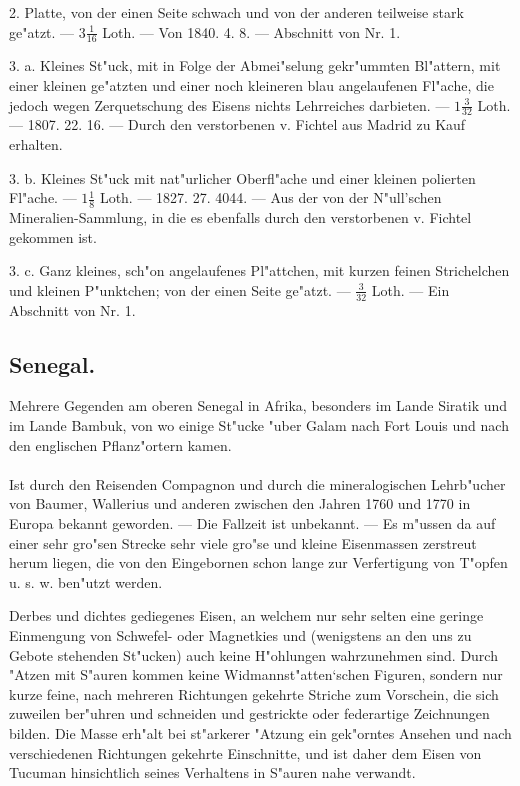 \documentclass[a4paper, 11pt, oneside, polutonikogreek, german]{article}
\begin{document}
2. Platte, von der einen Seite schwach und von der anderen teilweise stark ge"atzt. --- $3\frac{1}{16}$ Loth. --- Von 1840. 4. 8. --- Abschnitt von Nr. 1.

3. a. Kleines St"uck, mit in Folge der Abmei"selung gekr"ummten Bl"attern, mit einer kleinen ge"atzten und einer noch kleineren blau angelaufenen Fl"ache, die jedoch wegen Zerquetschung des Eisens nichts Lehrreiches darbieten. --- $1\frac{3}{32}$ Loth. --- 1807. 22. 16. --- Durch den verstorbenen v. Fichtel aus Madrid zu Kauf erhalten.

3. b. Kleines St"uck mit nat"urlicher Oberfl"ache und einer kleinen polierten Fl"ache. --- $1\frac{1}{8}$ Loth. --- 1827. 27. 4044. --- Aus der von der N"ull'schen Mineralien-Sammlung, in die es ebenfalls durch den verstorbenen v. Fichtel gekommen ist.

3. c. Ganz kleines, sch"on angelaufenes Pl"attchen, mit kurzen feinen Strichelchen und kleinen P"unktchen; von der einen Seite ge"atzt. --- $\frac{3}{32}$ Loth. --- Ein Abschnitt von Nr. 1.
\subsection{Senegal.}
\begin{center}
\small
Mehrere Gegenden am oberen Senegal in Afrika, besonders im Lande Siratik und im Lande Bambuk, von wo einige St"ucke "uber Galam nach Fort Louis und nach den englischen Pflanz"ortern kamen.
\end{center}
\paragraph{}
Ist durch den Reisenden Compagnon und durch die mineralogischen Lehrb"ucher von Baumer, Wallerius und anderen zwischen den Jahren 1760 und 1770 in Europa bekannt geworden. --- Die Fallzeit ist unbekannt. --- Es m"ussen da auf einer sehr gro"sen Strecke sehr viele gro"se und kleine Eisenmassen zerstreut herum liegen, die von den Eingebornen schon lange zur Verfertigung von T"opfen u. s. w. ben"utzt werden.

Derbes und dichtes gediegenes Eisen, an welchem nur sehr selten eine geringe Einmengung von Schwefel- oder Magnetkies und (wenigstens an den uns zu Gebote stehenden St"ucken) auch keine H"ohlungen wahrzunehmen sind. Durch "Atzen mit S"auren kommen keine Widmannst"atten‘schen Figuren, sondern nur kurze feine, nach mehreren Richtungen gekehrte Striche zum Vorschein, die sich zuweilen ber"uhren und schneiden und gestrickte oder federartige Zeichnungen bilden. Die Masse erh"alt bei st"arkerer "Atzung ein gek"orntes Ansehen und nach verschiedenen Richtungen gekehrte Einschnitte, und ist daher dem Eisen von Tucuman hinsichtlich seines Verhaltens in S"auren nahe verwandt.
\end{document}
